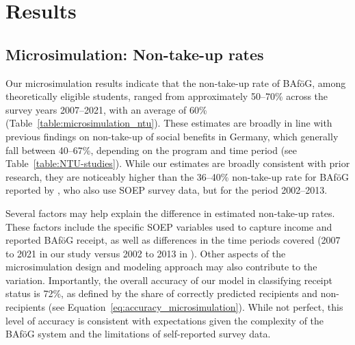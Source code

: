 %
%

\section{Results}


\subsection{Microsimulation: Non-take-up rates}

Our microsimulation results indicate that the non-take-up rate of BAföG, among theoretically eligible students, ranged from approximately 50--70\% across the survey years 2007--2021, with an average of 60\% (Table~\ref{table:microsimulation_ntu}). These estimates are broadly in line with previous findings on non-take-up of social benefits in Germany, which generally fall between 40--67\%, depending on the program and time period (see Table~\ref{table:NTU-studies}). While our estimates are broadly consistent with prior research, they are noticeably higher than the 36--40\% non-take-up rate for BAföG reported by \cite{herber_non-take-up_2019}, who also use SOEP survey data, but for the period 2002--2013.

Several factors may help explain the difference in estimated non-take-up rates. These factors include the specific SOEP variables used to capture income and reported BAföG receipt, as well as differences in the time periods covered (2007 to 2021 in our study versus 2002 to 2013 in \cite{herber_non-take-up_2019}). Other aspects of the microsimulation design and modeling approach may also contribute to the variation. Importantly, the overall accuracy of our model in classifying receipt status is 72\%, as defined by the share of correctly predicted recipients and non-recipients (see Equation~\ref{eq:accuracy_microsimulation}). While not perfect, this level of accuracy is consistent with expectations given the complexity of the BAföG system and the limitations of self-reported survey data.


